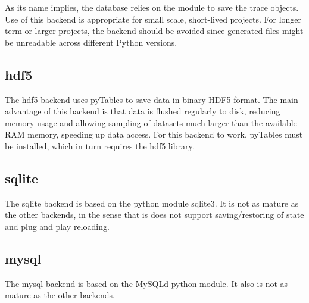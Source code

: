 As its name implies, the  database relies on the  module to save the trace objects. Use of this backend is appropriate for small scale, short-lived projects. For longer term or larger projects, the  backend should be avoided since generated files might be unreadable across different Python versions.



\hypertarget{hdf5}{}
\subsection*{hdf5}
\label{hdf5}

The hdf5 backend uses \href{http://www.pytables.org/moin}{pyTables} to save data in binary HDF5 format. The main advantage of this backend is that data is flushed regularly to disk, reducing memory usage and allowing sampling of datasets much larger than the available RAM memory, speeding up data access. For this backend to work, pyTables must be installed, which in turn requires the hdf5 library.



\hypertarget{sqlite}{}
\subsection*{sqlite}
\label{sqlite}

The sqlite backend is based on the python module sqlite3. It is not as mature as the other backends, in the sense that is does not support saving/restoring of state and plug and play reloading.



\hypertarget{mysql}{}
\subsection*{mysql}
\label{mysql}

The mysql backend is based on the MySQLd python module. It also is not as mature as the other backends.

